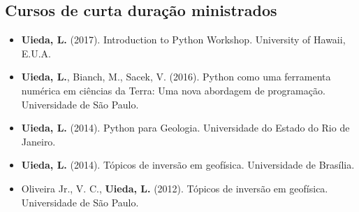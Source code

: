 \documentclass[12pt,a4paper,oneside,titlepage,onecolumn]{article}
\begin{document}
\subsection{Cursos de curta duração ministrados}

\begin{itemize}
    \item \textbf{Uieda, L.} (2017). Introduction to Python Workshop.
        University of Hawaii, E.U.A.
    \item \textbf{Uieda, L.}, Bianch, M., Sacek, V. (2016).
        Python como uma ferramenta numérica em ciências da Terra: Uma nova
        abordagem de programação. Universidade de São Paulo.
    \item \textbf{Uieda, L.} (2014). Python para Geologia. Universidade do
        Estado do Rio de Janeiro.
    \item \textbf{Uieda, L.} (2014). Tópicos de inversão em geofísica.
        Universidade de Brasília.
    \item Oliveira Jr., V. C., \textbf{Uieda, L.} (2012). Tópicos de inversão
        em geofísica.  Universidade de São Paulo.
\end{itemize}




\end{document}
